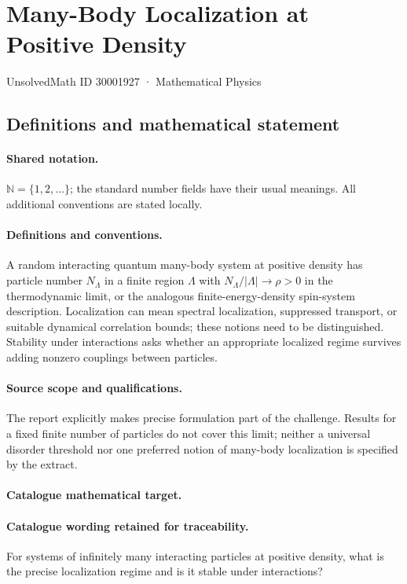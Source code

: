 \documentclass[11pt]{article}
\begin{document}
\setcounter{section}{30001926}
\section{Many-Body Localization at Positive Density}\label{30001927}
{\small UnsolvedMath ID 30001927 · Mathematical Physics}
\subsection{Definitions and mathematical statement}

\paragraph{Shared notation.}$\mathbb N=\{1,2,\ldots\}$; the standard number fields have their usual meanings. All additional conventions are stated locally.


\paragraph{Definitions and conventions.} A random interacting quantum many-body system at positive density has particle number $N_\Lambda$ in a finite region $\Lambda$ with $N_\Lambda/|\Lambda|\to\rho>0$ in the thermodynamic limit, or the analogous finite-energy-density spin-system description. Localization can mean spectral localization, suppressed transport, or suitable dynamical correlation bounds; these notions need to be distinguished. Stability under interactions asks whether an appropriate localized regime survives adding nonzero couplings between particles.

\paragraph{Source scope and qualifications.} The report explicitly makes precise formulation part of the challenge. Results for a fixed finite number of particles do not cover this limit; neither a universal disorder threshold nor one preferred notion of many-body localization is specified by the extract.

\paragraph{Catalogue mathematical target.}
\paragraph{Catalogue wording retained for traceability.}
For systems of infinitely many interacting particles at positive density, what is the precise localization regime and is it stable under interactions?
\end{document}
